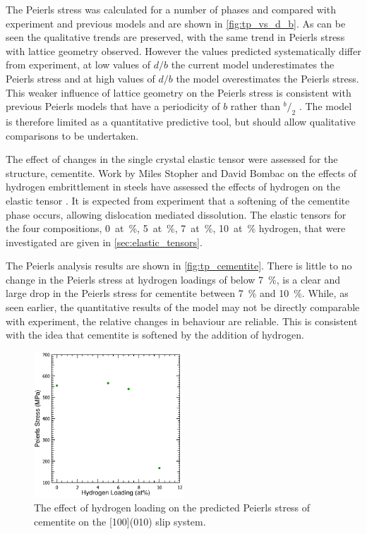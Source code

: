 The Peierls stress was calculated for a number of phases and compared with experiment and previous models and are shown in \autoref{fig:tp_vs_d_b}. As can be seen the qualitative trends are preserved, with the same trend in Peierls stress with lattice geometry observed. However the values predicted systematically differ from experiment, at low values of $d/b$ the current model underestimates the Peierls stress and at high values of $d/b$ the model overestimates the Peierls stress. This weaker influence of lattice geometry on the Peierls stress is consistent with previous Peierls models that have a periodicity of $b$ rather than $^b\!/_2$ \cite{Lu2000peierls}. The model is therefore limited as a quantitative predictive tool, but should allow qualitative comparisons to be undertaken.

The effect of changes in the single crystal elastic tensor were assessed for the  structure, cementite. Work by Miles Stopher and David Bombac on the effects of hydrogen embrittlement in steels have assessed the effects of hydrogen on the elastic tensor \cite{Stopher2017}. It is expected from experiment \cite{Stopher2017} that a softening of the cementite phase occurs, allowing dislocation mediated dissolution. The elastic tensors for the four compositions, \SI{0}{at\percent}, \SI{5}{at\percent}, \SI{7}{at\percent}, \SI{10}{at\percent} hydrogen, that were investigated are given in \autoref{sec:elastic_tensors}.



The Peierls analysis results are shown in \autoref{fig:tp_cementite}. There is little to no change in the Peierls stress at hydrogen loadings of below \SI{7}{\percent}, is a clear and large drop in the Peierls stress for cementite between \SI{7}{\percent} and \SI{10}{\percent}. While, as seen earlier, the quantitative results of the model may not be directly comparable with experiment, the relative changes in behaviour are reliable. This is consistent with the idea that cementite is softened by the addition of hydrogen.
\begin{figure}
\captionsetup{width=0.6\textwidth}
\centering
\includegraphics[width=0.5\textwidth]{Peierls_Stress_Cementite}
\caption[The effect of hydrogen on the Peierls stress of cementite]{The effect of hydrogen loading on the predicted Peierls stress of cementite on the [100](010) slip system.\label{fig:tp_cementite}}
\end{figure}



